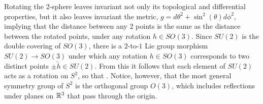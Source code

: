 


Rotating the 2-sphere leaves invariant not only its topological and differential properties, but it also leaves invariant the metric, $g = d\theta^2 + \sin^2(\theta) d\phi^2$, implying that the distance between any $2$ points is the same as the distance between the rotated points, under any rotation $h \in SO(3)$. Since $SU(2)$ is the double covering of $SO(3)$, there is a $2$-to-$1$ Lie group morphism $SU(2) \to SO(3)$ under which any rotation $h \in SO(3)$ corresponds to two distinct points $\pm \tilde h \in SU(2)$. From this it follows that each element of $SU(2)$ acts as a rotation on $S^2$, so that . Notice, however, that the most general symmetry group of $S^2$ is the orthogonal group $O(3)$, which includes reflections under planes on $\mathbb{R}^3$ that pass through the origin.

